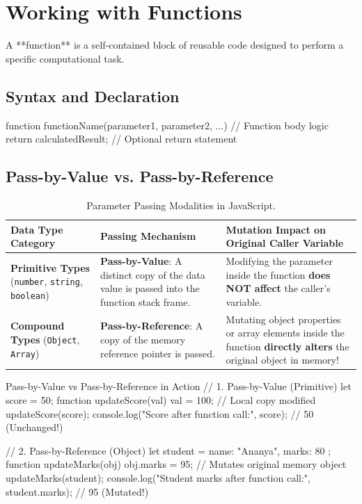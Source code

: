 \section{Working with Functions}

A **function** is a self-contained block of reusable code designed to perform a specific computational task.

\subsection{Syntax and Declaration}
\begin{syntaxbox}
function functionName(parameter1, parameter2, ...) {
    // Function body logic
    return calculatedResult; // Optional return statement
}
\end{syntaxbox}

\subsection{Pass-by-Value vs. Pass-by-Reference}
\begin{table}[htbp]
\centering
\small
\renewcommand{\arraystretch}{1.3}
\begin{tabularx}{\linewidth}{l>{\raggedright\arraybackslash}X>{\raggedright\arraybackslash}X}
\toprule
\textbf{Data Type Category} & \textbf{Passing Mechanism} & \textbf{Mutation Impact on Original Caller Variable} \\
\midrule
\textbf{Primitive Types} (\texttt{number}, \texttt{string}, \texttt{boolean}) & \textbf{Pass-by-Value}: A distinct copy of the data value is passed into the function stack frame. & Modifying the parameter inside the function \textbf{does NOT affect} the caller's variable. \\
\textbf{Compound Types} (\texttt{Object}, \texttt{Array}) & \textbf{Pass-by-Reference}: A copy of the memory reference pointer is passed. & Mutating object properties or array elements inside the function \textbf{directly alters} the original object in memory! \\
\bottomrule
\end{tabularx}
\caption{Parameter Passing Modalities in JavaScript.}
\label{tab:pass-by-value-ref}
\end{table}

\begin{jscode}{Pass-by-Value vs Pass-by-Reference in Action}
// 1. Pass-by-Value (Primitive)
let score = 50;
function updateScore(val) {
    val = 100; // Local copy modified
}
updateScore(score);
console.log("Score after function call:", score); // 50 (Unchanged!)

// 2. Pass-by-Reference (Object)
let student = { name: "Ananya", marks: 80 };
function updateMarks(obj) {
    obj.marks = 95; // Mutates original memory object
}
updateMarks(student);
console.log("Student marks after function call:", student.marks); // 95 (Mutated!)
\end{jscode}

